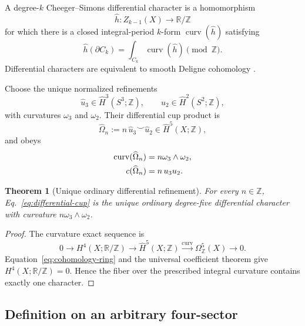 \documentclass[11pt]{article}
\newtheorem{theorem}{Theorem}[section]
\theoremstyle{definition}
\theoremstyle{remark}
\newcommand{\ZZ}{\mathbb Z}
\newcommand{\RR}{\mathbb R}
\begin{document}
A degree-\(k\) Cheeger--Simons differential character is a homomorphism
\begin{equation}
 \widehat h:Z_{k-1}(X)\longrightarrow\RR/\ZZ
 \label{eq:character-definition}
\end{equation}
for which there is a closed integral-period \(k\)-form
\(\operatorname{curv}(\widehat h)\) satisfying
\begin{equation}
 \widehat h(\partial C_k)
 =\int_{C_k}\operatorname{curv}(\widehat h)\pmod\ZZ.
 \label{eq:character-boundary}
\end{equation}
Differential characters are equivalent to smooth Deligne cohomology
\cite{CheegerSimons1985,Brylinski1993}.

Choose the unique normalized refinements
\begin{equation}
 \widehat u_3\in\widehat H^3(S^3;\ZZ),
 \qquad
 \widehat u_2\in\widehat H^2(S^2;\ZZ),
 \label{eq:factor-characters}
\end{equation}
with curvatures \(\omega_3\) and \(\omega_2\).  Their differential cup
product is
\begin{equation}
 \widehat\Omega_n
 :=n\,\widehat u_3\smile\widehat u_2
 \in\widehat H^5(X;\ZZ),
 \label{eq:differential-cup}
\end{equation}
and obeys
\begin{align}
 \operatorname{curv}(\widehat\Omega_n)
 &=n\omega_3\wedge\omega_2,\notag\\
 c(\widehat\Omega_n)&=n\,u_3u_2.
 \label{eq:cup-data}
\end{align}

\begin{theorem}[Unique ordinary differential refinement]
For every \(n\in\ZZ\), Eq.~\eqref{eq:differential-cup} is the unique
ordinary degree-five differential character with curvature
\(n\omega_3\wedge\omega_2\).
\end{theorem}
\begin{proof}
The curvature exact sequence is
\begin{equation}
 0\longrightarrow H^4(X;\RR/\ZZ)
 \longrightarrow\widehat H^5(X;\ZZ)
 \xrightarrow{\operatorname{curv}}\Omega^5_{\ZZ}(X)
 \longrightarrow0.
 \label{eq:curvature-sequence}
\end{equation}
Equation~\eqref{eq:cohomology-ring} and the universal coefficient theorem
give \(H^4(X;\RR/\ZZ)=0\).  Hence the fiber over the prescribed integral
curvature contains exactly one character.
\end{proof}

\subsection{Definition on an arbitrary four-sector}
\end{document}
